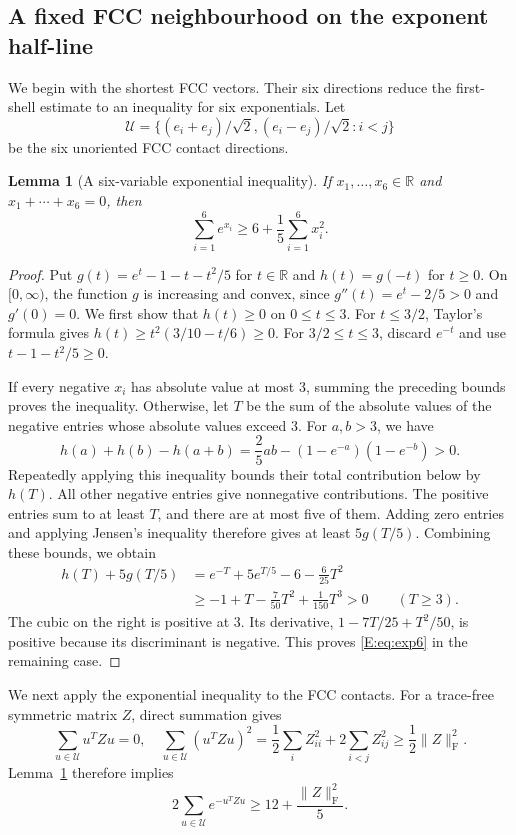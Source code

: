 \documentclass[reqno,english]{amsart}
\newtheorem{lemma}[theorem]{Lemma}
\theoremstyle{definition}
\newtheorem{open problem}[theorem]{Open Problem}
\theoremstyle{remark}
\theoremstyle{plain}
\newcommand{\R}{{\mathbb R}}
\numberwithin{equation}{section}
\newcommand{\norm}[1]{\lVert#1\rVert_{\mathrm F}}
\begin{document}
\subsection{A fixed FCC neighbourhood on the exponent half-line}\label{E:sec:high-local}
We begin with the shortest FCC vectors. Their six directions reduce
the first-shell estimate to an inequality for six exponentials.
Let
\[
 \mathcal U=\{(e_i+e_j)/\sqrt2,(e_i-e_j)/\sqrt2:i<j\}
\]
be the six unoriented FCC contact directions.

\begin{lemma}[A six-variable exponential inequality]\label{E:lem:exp6}
If $x_1,\ldots,x_6\in\R$ and $x_1+\cdots+x_6=0$, then
\begin{equation}
 \sum_{i=1}^6e^{x_i}\ge6+\frac15\sum_{i=1}^6x_i^2.
 \label{E:eq:exp6}
\end{equation}
\end{lemma}
\begin{proof}
Put $g(t)=e^t-1-t-t^2/5$ for $t\in\R$ and
$h(t)=g(-t)$ for $t\ge0$. On $[0,\infty)$, the function $g$
is increasing and convex, since $g''(t)=e^t-2/5>0$ and
$g'(0)=0$. We first show that $h(t)\ge0$ on $0\le t\le3$.
For $t\le3/2$, Taylor's formula gives
$h(t)\ge t^2(3/10-t/6)\ge0$. For $3/2\le t\le3$, discard
$e^{-t}$ and use $t-1-t^2/5\ge0$.

If every negative $x_i$ has absolute value at most $3$, summing
the preceding bounds proves the inequality. Otherwise, let $T$ be
the sum of the absolute values of the negative entries whose
absolute values exceed $3$. For $a,b>3$, we have
\[
 h(a)+h(b)-h(a+b)=\frac25ab-(1-e^{-a})(1-e^{-b})>0.
\]
Repeatedly applying this inequality bounds their total contribution
below by $h(T)$. All other negative entries give nonnegative
contributions. The positive entries sum to at least $T$, and there
are at most five of them. Adding zero entries and applying Jensen's
inequality therefore gives at least $5g(T/5)$. Combining these
bounds, we obtain
\begin{align*}
 h(T)+5g(T/5)
 &=e^{-T}+5e^{T/5}-6-\frac6{25}T^2\\
 &\ge-1+T-\frac7{50}T^2+\frac1{150}T^3>0\qquad(T\ge3).
\end{align*}
The cubic on the right is positive at $3$. Its derivative,
$1-7T/25+T^2/50$, is positive because its discriminant is negative.
This proves \eqref{E:eq:exp6} in the remaining case.
\end{proof}

We next apply the exponential inequality to the FCC contacts.
For a trace-free symmetric matrix $Z$, direct summation gives
\begin{equation}
 \sum_{u\in\mathcal U}u^TZu=0,
 \quad
 \sum_{u\in\mathcal U}(u^TZu)^2
 =\frac12\sum_i Z_{ii}^2+2\sum_{i<j}Z_{ij}^2\ge\frac12\norm Z^2.
 \label{E:eq:contact-moments}
\end{equation}
Lemma~\ref{E:lem:exp6} therefore implies
\begin{equation}
 2\sum_{u\in\mathcal U}e^{-u^TZu}\ge12+\frac{\norm Z^2}{5}.
 \label{E:eq:V-improved}
\end{equation}
\end{document}
